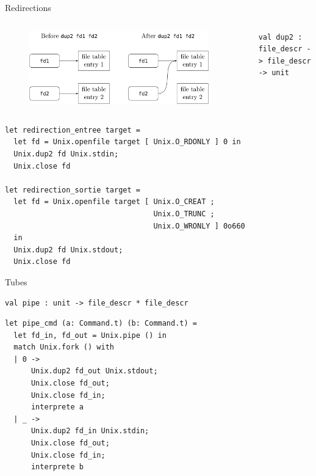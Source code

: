 \begin{frame}[fragile]{Redirections}

\begin{columns}

\begin{figure}
    \centering
    \includegraphics[width=\textwidth]{slides/images/dup2.png}
\end{figure}

\\
\begin{lstlisting}
val dup2 : file_descr -> file_descr -> unit
\end{lstlisting}

\end{columns}


\begin{lstlisting}
let redirection_entree target =
  let fd = Unix.openfile target [ Unix.O_RDONLY ] 0 in
  Unix.dup2 fd Unix.stdin;
  Unix.close fd

let redirection_sortie target =
  let fd = Unix.openfile target [ Unix.O_CREAT ; 
                                  Unix.O_TRUNC ; 
                                  Unix.O_WRONLY ] 0o660
  in
  Unix.dup2 fd Unix.stdout;
  Unix.close fd
\end{lstlisting}

\end{frame}

\begin{frame}[fragile]{Tubes}

\begin{lstlisting}
val pipe : unit -> file_descr * file_descr
\end{lstlisting}

\begin{lstlisting}
let pipe_cmd (a: Command.t) (b: Command.t) =
  let fd_in, fd_out = Unix.pipe () in
  match Unix.fork () with
  | 0 ->
      Unix.dup2 fd_out Unix.stdout;
      Unix.close fd_out;
      Unix.close fd_in;
      interprete a
  | _ ->
      Unix.dup2 fd_in Unix.stdin;
      Unix.close fd_out;
      Unix.close fd_in;
      interprete b
\end{lstlisting}

\end{frame}